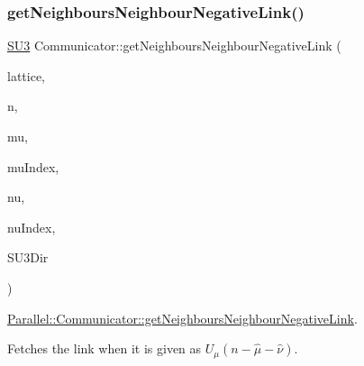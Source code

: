 \subsubsection{\texorpdfstring{getNeighboursNeighbourNegativeLink()}{getNeighboursNeighbourNegativeLink()}}
{\footnotesize\ttfamily \mbox{\hyperlink{class_s_u3}{S\+U3}} Communicator\+::get\+Neighbours\+Neighbour\+Negative\+Link (\begin{DoxyParamCaption}\item[{\mbox{\hyperlink{class_lattice}{Lattice}}$<$ \mbox{\hyperlink{class_s_u3}{S\+U3}} $>$ $\ast$}]{lattice,  }\item[{std\+::vector$<$ int $>$}]{n,  }\item[{int}]{mu,  }\item[{int $\ast$}]{mu\+Index,  }\item[{int}]{nu,  }\item[{int $\ast$}]{nu\+Index,  }\item[{int}]{S\+U3\+Dir }\end{DoxyParamCaption})\hspace{0.3cm}{\ttfamily [static]}}



\mbox{\hyperlink{class_parallel_1_1_communicator_a1c598fae96e05e3b36db368e60453d63}{Parallel\+::\+Communicator\+::get\+Neighbours\+Neighbour\+Negative\+Link}}. 

Fetches the link when it is given as $U_\mu(n - \hat{\mu} - \hat{\nu})$.


